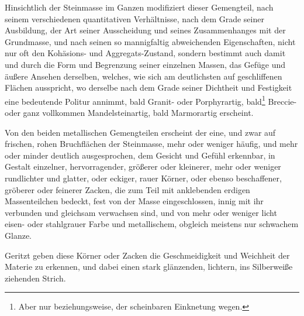 \documentclass[a4paper, 11pt, oneside, german]{article}
\begin{document}
Hinsichtlich der Steinmasse im Ganzen modifiziert dieser Gemengteil, nach seinem verschiedenen quantitativen Verhältnisse, nach dem Grade seiner Ausbildung, der Art seiner Ausscheidung und seines Zusammenhanges mit der Grundmasse, und nach seinen so mannigfaltig abweichenden Eigenschaften, nicht nur oft den Kohäsions- und Aggregats-Zustand, sondern bestimmt auch damit und durch die Form und Begrenzung seiner einzelnen Massen, das Gefüge und äußere Ansehen derselben, welches, wie sich am deutlichsten auf geschliffenen Flächen ausspricht, wo derselbe nach dem Grade seiner Dichtheit und Festigkeit eine bedeutende Politur annimmt, bald Granit- oder Porphyrartig, bald\footnote{Aber nur beziehungsweise, der scheinbaren Einknetung wegen.} Breccie- oder ganz vollkommen Mandelsteinartig, bald Marmorartig erscheint.

Von den beiden metallischen Gemengteilen erscheint der eine, und zwar auf frischen, rohen Bruchflächen der Steinmasse, mehr oder weniger häufig, und mehr oder minder deutlich ausgesprochen, dem Gesicht und Gefühl erkennbar, in Gestalt einzelner, hervorragender, größerer oder kleinerer, mehr oder weniger rundlichter und glatter, oder eckiger, rauer Körner, oder ebenso beschaffener, gröberer oder feinerer Zacken, die zum Teil mit anklebenden erdigen Massenteilchen bedeckt, fest von der Masse eingeschlossen, innig mit ihr verbunden und gleichsam verwachsen sind, und von mehr oder weniger licht eisen- oder stahlgrauer Farbe und metallischem, obgleich meistens nur schwachem Glanze.

Geritzt geben diese Körner oder Zacken die Geschmeidigkeit und Weichheit der Materie zu erkennen, und dabei einen stark glänzenden, lichtern, ins Silberweiße ziehenden Strich.
\end{document}
